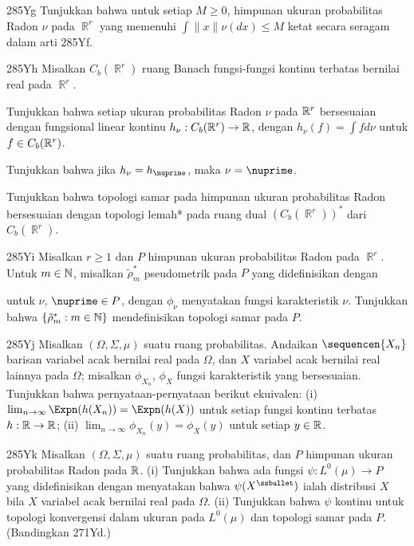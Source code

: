 {\spheader 285Yg Tunjukkan bahwa untuk setiap $M\ge 0$, himpunan ukuran
probabilitas Radon $\nu$ pada $\BbbR^r$ yang memenuhi
$\int\|x\|\nu(dx)\le M$ ketat secara seragam dalam arti 285Yf.

\spheader 285Yh Misalkan $C_b(\BbbR^r)$ ruang Banach fungsi-fungsi kontinu
terbatas bernilai real pada $\BbbR^r$.

 Tunjukkan bahwa setiap ukuran probabilitas Radon $\nu$ pada
$\Bbb R^r$ bersesuaian dengan fungsional linear kontinu
$h_{\nu}:C_b(\Bbb R^r)\to\Bbb R$, dengan $h_{\nu}(f)=\int fd\nu$ untuk
$f\in C_b(\Bbb R^r)$.

 Tunjukkan bahwa jika $h_{\nu}=h_{\nuprime}$, maka $\nu=\nuprime$.

 Tunjukkan bahwa topologi samar pada himpunan ukuran probabilitas
Radon bersesuaian dengan topologi lemah* pada ruang dual
$(C_b(\BbbR^r))^*$ dari $C_b(\BbbR^r)$.

\spheader 285Yi Misalkan $r\ge 1$ dan $P$ himpunan ukuran probabilitas Radon
pada $\BbbR^r$. Untuk $m\in\Bbb N$, misalkan $\tilde\rho^*_m$ pseudometrik
pada $P$ yang didefinisikan dengan


\noindent untuk $\nu$, $\nuprime\in P$, dengan $\phi_{\nu}$ menyatakan fungsi
karakteristik $\nu$. Tunjukkan bahwa $\{\tilde\rho^*_m:m\in\Bbb N\}$
mendefinisikan topologi samar pada $P$.

\spheader 285Yj Misalkan $(\Omega,\Sigma,\mu)$ suatu ruang probabilitas.
Andaikan $\sequencen{X_n}$ barisan variabel acak bernilai real pada $\Omega$,
dan $X$ variabel acak bernilai real lainnya pada $\Omega$; misalkan
$\phi_{X_n}$, $\phi_X$ fungsi karakteristik yang bersesuaian. Tunjukkan bahwa
pernyataan-pernyataan berikut ekuivalen: (i)
$\lim_{n\to\infty}\Expn(h(X_n))=\Expn(h(X))$ untuk setiap fungsi kontinu
terbatas $h:\Bbb R\to\Bbb R$; (ii)
$\lim_{n\to\infty}\phi_{X_n}(y)=\phi_X(y)$ untuk setiap $y\in\Bbb R$.

\spheader 285Yk Misalkan $(\Omega,\Sigma,\mu)$ suatu ruang probabilitas, dan
$P$ himpunan ukuran probabilitas Radon pada $\Bbb R$. (i) Tunjukkan bahwa ada
fungsi $\psi:L^0(\mu)\to P$ yang didefinisikan dengan menyatakan bahwa
$\psi(X^{\ssbullet})$ ialah distribusi $X$ bila $X$ variabel acak bernilai real
pada $\Omega$. (ii) Tunjukkan bahwa $\psi$ kontinu untuk topologi konvergensi
dalam ukuran pada $L^0(\mu)$ dan topologi samar pada $P$. (Bandingkan 271Yd.)

}
